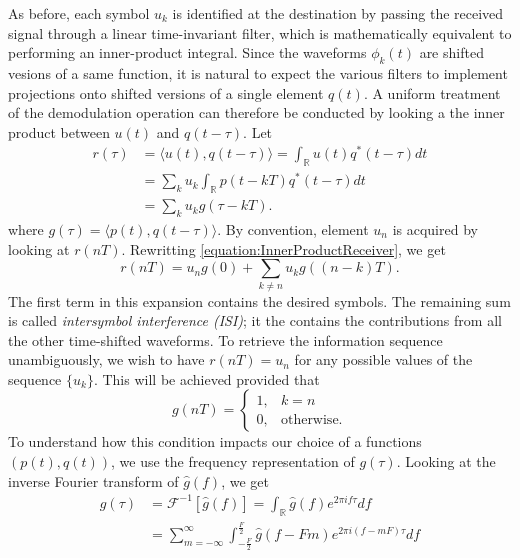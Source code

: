 As before, each symbol $u_k$ is identified at the destination by passing the received signal through a linear time-invariant filter, which is mathematically equivalent to performing an inner-product integral.
Since the waveforms $\phi_k (t)$ are shifted vesions of a same function, it is natural to expect the various filters to implement projections onto shifted versions of a single element $q(t)$.
A uniform treatment of the demodulation operation can therefore be conducted by looking a the inner product between $u(t)$ and $q(t-\tau)$.
Let
\begin{equation} \label{equation:InnerProductReceiver}
\begin{split}
r(\tau) &= \langle u(t), q(t-\tau) \rangle
= \int_{\mathbb{R}} u(t) q^*(t-\tau) dt \\
&= \sum_{k} u_k \int_{\mathbb{R}} p(t - kT) q^*(t-\tau) dt \\
&= \sum_{k} u_k g(\tau - kT) .
\end{split}
\end{equation}
where $g(\tau) = \langle p(t), q(t-\tau) \rangle$.
By convention, element $u_n$ is acquired by looking at $r(nT)$.
Rewritting \eqref{equation:InnerProductReceiver}, we get
\begin{equation*}
r(nT) = u_n g(0) + \sum_{k \neq n} u_k g((n - k)T) .
\end{equation*}
The first term in this expansion contains the desired symbols.
The remaining sum is called \emph{intersymbol interference (ISI)}; it the contains the contributions from all the other time-shifted waveforms.
To retrieve the information sequence unambiguously, we wish to have $r(nT) = u_n$ for any possible values of the sequence $\{ u_k \}$.
This will be achieved provided that
\begin{equation} \label{equation:NoInterSymbolInterferenceSpecification}
g(nT) = \begin{cases} 1, & k = n \\
0, & \text{otherwise} . \end{cases}
\end{equation}
To understand how this condition impacts our choice of a functions $(p(t), q(t))$, we use the frequency representation of $g(\tau)$.
Looking at the inverse Fourier transform of $\hat{g}(f)$, we get
\begin{equation*}
\begin{split}
g(\tau) &= \mathcal{F}^{-1} \left[ \hat{g} (f) \right]
= \int_{\mathbb{R}} \hat{g}(f) e^{2 \pi i f \tau} df \\
&= \sum_{m = -\infty}^{\infty} \int_{-\frac{F}{2}}^{\frac{F}{2}}
\hat{g} (f - Fm) e^{2 \pi i (f - mF) \tau} df
\end{split}
\end{equation*}
